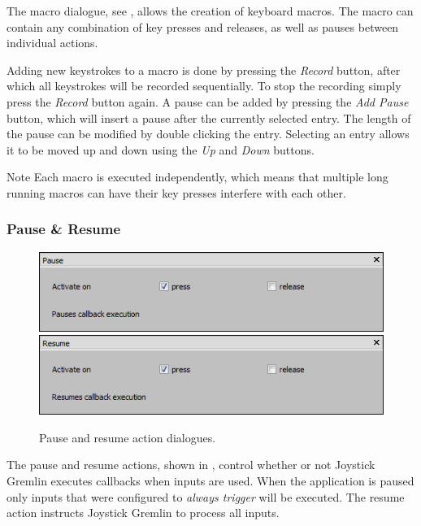 \documentclass[a4, 10pt]{article}
\newcommand{\JG}{Joystick Gremlin}
\begin{document}
The macro dialogue, see , allows the creation of
keyboard macros. The macro can contain any combination of key presses
and releases, as well as pauses between individual actions.

Adding new keystrokes to a macro is done by pressing the \emph{Record}
button, after which all keystrokes will be recorded sequentially. To
stop the recording simply press the \emph{Record} button again. A pause
can be added by pressing the \emph{Add Pause} button, which will insert
a pause after the currently selected entry. The length of the pause can
be modified by double clicking the entry. Selecting an entry allows it
to be moved up and down using the \emph{Up} and \emph{Down} buttons.

\vspace{1em}
\begin{bclogo}[
    couleur=yellow!40,
    couleurBord=orange!80,
    couleurBarre=orange!80,
    arrondi=0.1,
    logo=\bcinfo
]{Note}
    Each macro is executed independently, which means that multiple long
    running macros can have their key presses interfere with each other.
\end{bclogo}


\subsubsection{Pause \& Resume}

\begin{figure}[bt]
    \centering

    \includegraphics[width=0.75\linewidth]{images/action_pause}
    \includegraphics[width=0.75\linewidth]{images/action_resume}

    \caption{Pause and resume action dialogues.}
    \label{fig:action_pause_resume}
\end{figure}

The pause and resume actions, shown in ,
control whether or not \JG{} executes callbacks when inputs are used.
When the application is paused only inputs that were configured to
\emph{always trigger} will be executed.  The resume action instructs
\JG{} to process all inputs.
\end{document}
